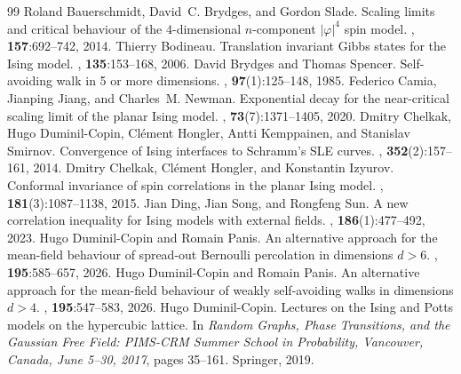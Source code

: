 \documentclass[10pt,a4paper]{amsart}
\numberwithin{equation}{section}
\begin{document}
\begin{thebibliography}{99}
 Roland Bauerschmidt, David~C. Brydges, and Gordon Slade. \newblock Scaling limits and critical behaviour of the $4$-dimensional $n$-component $|\varphi|^4$ spin model. , \textbf{157}:692--742, 2014.
 Thierry Bodineau. \newblock Translation invariant {G}ibbs states for the {I}sing model. , \textbf{135}:153--168, 2006.
 David Brydges and Thomas Spencer. \newblock Self-avoiding walk in 5 or more dimensions. , \textbf{97}(1):125--148, 1985.
 Federico Camia, Jianping Jiang, and Charles~M. Newman. \newblock Exponential decay for the near-critical scaling limit of the planar {I}sing model. , \textbf{73}(7):1371--1405, 2020.
 Dmitry Chelkak, Hugo Duminil-Copin, Cl{\'e}ment Hongler, Antti Kemppainen, and Stanislav Smirnov. \newblock Convergence of {I}sing interfaces to {S}chramm's {SLE} curves. , \textbf{352}(2):157--161, 2014.
 Dmitry Chelkak, Cl{\'e}ment Hongler, and Konstantin Izyurov. \newblock Conformal invariance of spin correlations in the planar {I}sing model. , \textbf{181}(3):1087--1138, 2015.
 Jian Ding, Jian Song, and Rongfeng Sun. \newblock A new correlation inequality for {I}sing models with external fields. , \textbf{186}(1):477--492, 2023.
 Hugo Duminil-Copin and Romain Panis. \newblock An alternative approach for the mean-field behaviour of spread-out {B}ernoulli percolation in dimensions $d>6$. , {\bf 195}:585--657, 2026.
 Hugo Duminil-Copin and Romain Panis. \newblock An alternative approach for the mean-field behaviour of weakly self-avoiding walks in dimensions $d>4$. , {\bf 195}:547--583, 2026.
 Hugo Duminil-Copin. \newblock Lectures on the {I}sing and {P}otts models on the hypercubic lattice. \newblock In {\em Random Graphs, Phase Transitions, and the Gaussian Free Field: PIMS-CRM Summer School in Probability, Vancouver, Canada, June 5--30, 2017}, pages 35--161. Springer, 2019.

\end{thebibliography}
\end{document}
